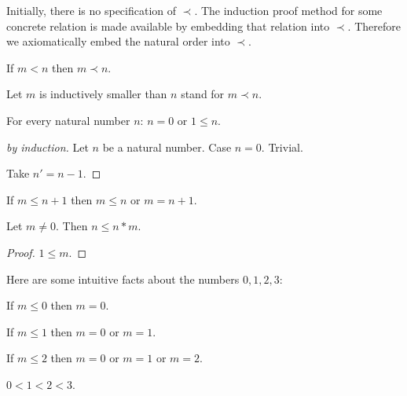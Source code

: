 \documentclass[11pt]{article}
\begin{document}
Initially, there is no specification of $\prec$.
The induction proof method for some concrete relation 
is made available by embedding that relation
into $\prec$. Therefore we axiomatically embed the natural
order into $\prec$.

\begin{forthel}
\begin{axiom}
If $m < n$ then $m \prec n$.
\end{axiom}

Let $m$ is inductively smaller than $n$ stand for $m \prec n$.

\end{forthel}

\begin{forthel}

\begin{lemma}
For every natural number $n$: $n = 0$ or $1 \leq n$.
\end{lemma}
\begin{proof}[by induction]
Let $n$ be a natural number.
Case $n = 0$. Trivial.

Take $n' = n - 1$. 
\end{proof}

\begin{lemma}
If $m \leq n+1$ then $m \leq n$ or $m = n+1$.
\end{lemma}


\begin{lemma}
Let $m \neq 0$. Then $n \leq n * m$.
\end{lemma}
\begin{proof}
$1 \leq m$.
\end{proof}
\end{forthel}

Here are some intuitive facts about the numbers $0,1,2,3$:

\begin{forthel}
\begin{lemma}
If $m \leq 0$ then $m = 0$.
\end{lemma}

\begin{lemma}
If $m \leq 1$ then $m = 0$ or $m = 1$.
\end{lemma}

\begin{lemma}
If $m \leq 2$ then $m = 0$ or $m = 1$ or $m = 2$.
\end{lemma}

\begin{lemma}
$0 < 1 < 2 < 3$.
\end{lemma}

\end{forthel}
\end{document}
